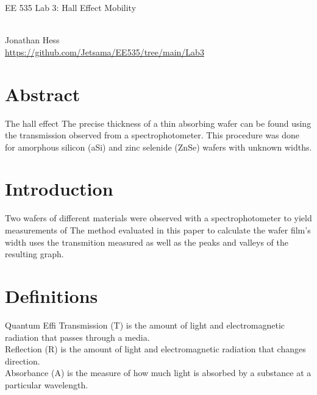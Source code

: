 \documentclass[10pt,a4paper]{article}
\begin{document}
\begin{multicols}{2}
\newenvironment{indentPar}[1]%
 {\begin{list}{}%
         {\setlength{\leftmargin}{#1}}%
         \item[]%
 }
 {\end{list}}

\begin{flushleft}
\begin{LARGE}EE 535 Lab 3: Hall Effect Mobility
\end{LARGE}
\\Jonathan Hess
\\\href{https://github.com/Jetsama/EE535/tree/main/Lab3}{https://github.com/Jetsama/EE535/tree/main/Lab3}
\end{flushleft}


\section*{Abstract}
The hall effect
The precise thickness of a thin absorbing wafer can be found using the transmission observed from a spectrophotometer. This procedure was done for amorphous silicon (aSi) and zinc selenide (ZnSe) wafers with unknown widths.





\section*{Introduction}

Two wafers of different materials were observed with a spectrophotometer to yield measurements of The method evaluated in this paper to calculate the wafer film's width uses the transmition measured as well as the peaks and valleys of the resulting graph. 




\section*{Definitions}
Quantum Effi
Transmission (T) is the amount of light and electromagnetic radiation that passes through a media.\\
Reflection (R) is the amount of light and electromagnetic radiation that changes direction. \\
Absorbance (A) is the measure of how much light is absorbed by a substance at a particular wavelength.\\




\end{multicols}
\end{document}
